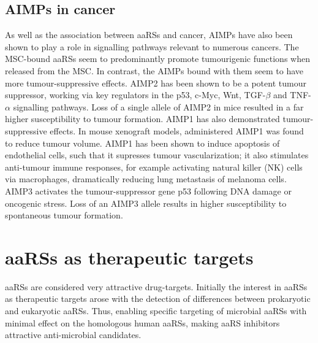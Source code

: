 \subsection{AIMPs in cancer}
As well as the association between aaRSs and cancer, AIMPs have also been shown to play a role in signalling pathways relevant to numerous cancers.
The MSC-bound aaRSs seem to predominantly promote tumourigenic functions when released from the MSC.
In contrast, the AIMPs bound with them seem to have more tumour-suppressive effects.
AIMP2 has been shown to be a potent tumour suppressor, working via key regulators in the p53, c-Myc, Wnt, TGF-$\beta$ and TNF-$\alpha$ signalling pathways.
Loss of a single allele of AIMP2 in mice resulted in a far higher susceptibility to tumour formation\cite{choi2009multidirectional}.
AIMP1 has also demonstrated tumour-suppressive effects.
In mouse xenograft models, administered AIMP1 was found to reduce tumour volume\cite{han2010antitumor, lee2006antitumor}.
AIMP1 has been shown to induce apoptosis of endothelial cells, such that it supresses tumour vascularization\cite{park2002dose}; it also stimulates anti-tumour immune responses, for example activating natural killer (NK) cells via macrophages, dramatically reducing lung metastasis of melanoma cells\cite{kim2017aminoacyl}.
AIMP3 activates the tumour-suppressor gene p53 following DNA damage or oncogenic stress.
Loss of an AIMP3 allele results in higher susceptibility to spontaneous tumour formation\cite{park2005haploinsufficient}.


\section{aaRSs as therapeutic targets}
aaRSs are considered very attractive drug-targets.
Initially the interest in aaRSs as therapeutic targets arose with the detection of differences between prokaryotic and eukaryotic aaRSs.
Thus, enabling specific targeting of microbial aaRSs with minimal effect on the homologous human aaRSs, making aaRS inhibitors attractive anti-microbial candidates.


